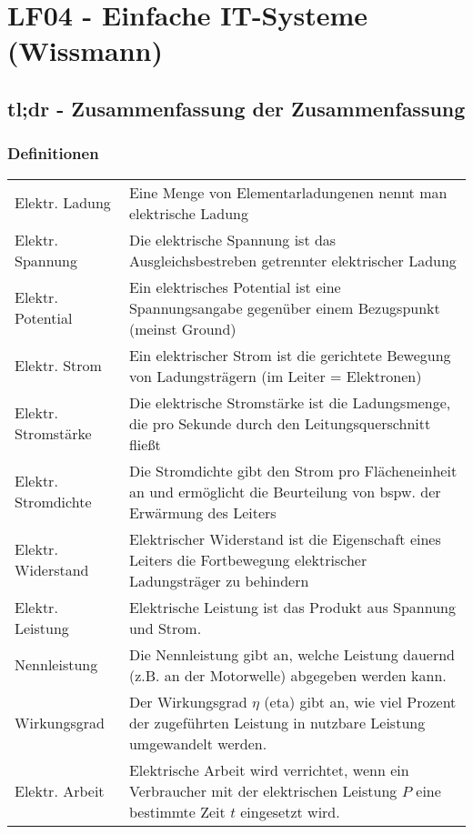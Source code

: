 \section{LF04 - Einfache IT-Systeme (Wissmann)}

\subsection{tl;dr - Zusammenfassung der Zusammenfassung}

\subsubsection{Definitionen}
\begin{tabular}{	p{}
				p{}}
Elektr. Ladung & Eine Menge von Elementarladungenen nennt man elektrische Ladung\\
Elektr. Spannung & Die elektrische Spannung ist das Ausgleichsbestreben getrennter elektrischer Ladung\\
Elektr. Potential & Ein elektrisches Potential ist eine Spannungsangabe gegenüber einem Bezugspunkt (meinst Ground)\\
Elektr. Strom & Ein elektrischer Strom ist die gerichtete Bewegung von Ladungsträgern (im Leiter = Elektronen)\\
Elektr. Stromstärke & Die elektrische Stromstärke ist die Ladungsmenge, die pro Sekunde durch den Leitungsquerschnitt fließt\\
Elektr. Stromdichte & Die Stromdichte gibt den Strom pro Flächeneinheit an und ermöglicht die Beurteilung von bspw. der Erwärmung des Leiters\\
Elektr. Widerstand & Elektrischer Widerstand ist die Eigenschaft eines Leiters die Fortbewegung elektrischer Ladungsträger zu behindern\\
Elektr. Leistung & Elektrische Leistung ist das Produkt aus Spannung und Strom.\\
Nennleistung & Die Nennleistung gibt an, welche Leistung dauernd (z.B. an der Motorwelle) abgegeben werden kann.\\
Wirkungsgrad & Der Wirkungsgrad $\eta$ (eta) gibt an, wie viel Prozent der zugeführten Leistung in nutzbare Leistung umgewandelt werden.\\
Elektr. Arbeit & Elektrische Arbeit wird verrichtet, wenn ein Verbraucher mit der elektrischen Leistung $P$ eine bestimmte Zeit $t$ eingesetzt wird.\\
\end{tabular}

